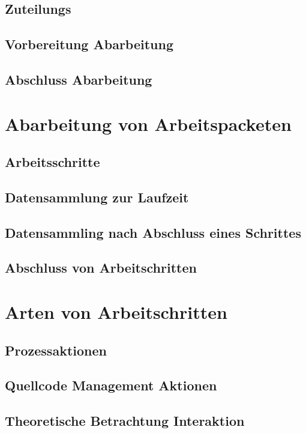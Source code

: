 \subsection{Zuteilungs}
\subsection{Vorbereitung Abarbeitung}
\subsection{Abschluss Abarbeitung}


\section{Abarbeitung von Arbeitspacketen}
\subsection{Arbeitsschritte}
\subsection{Datensammlung zur Laufzeit}
\subsection{Datensammling nach Abschluss eines Schrittes}
\subsection{Abschluss von Arbeitschritten}


\section{Arten von Arbeitschritten}
\subsection{Prozessaktionen}
\subsection{Quellcode Management Aktionen}
\subsection{Theoretische Betrachtung Interaktion}

